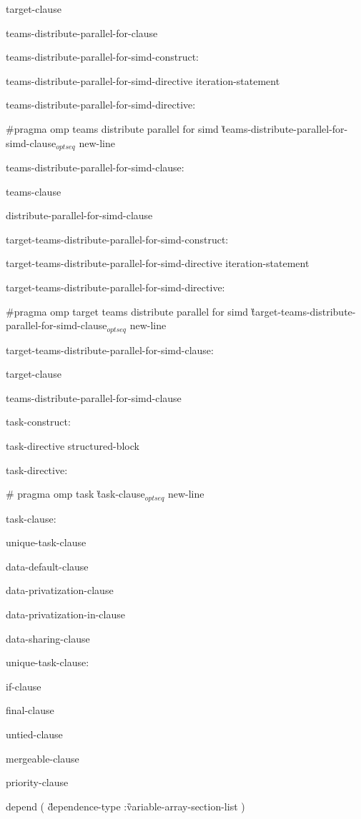{\I\I target-clause

\I\I teams-distribute-parallel-for-clause

\I teams-distribute-parallel-for-simd-construct:

\I\I teams-distribute-parallel-for-simd-directive iteration-statement

\I teams-distribute-parallel-for-simd-directive:

\C\I \#pragma omp teams distribute parallel for simd \G teams-distribute-parallel-for-simd-clause$_{optseq}$ new-line

\I teams-distribute-parallel-for-simd-clause:

\I\I teams-clause

\I\I distribute-parallel-for-simd-clause

\I target-teams-distribute-parallel-for-simd-construct:

\I\I target-teams-distribute-parallel-for-simd-directive iteration-statement

\I target-teams-distribute-parallel-for-simd-directive:

\C\I\I \#pragma omp target teams distribute parallel for simd \G target-teams-distribute-parallel-for-simd-clause$_{optseq}$ new-line

\I target-teams-distribute-parallel-for-simd-clause:

\I\I target-clause

\I\I teams-distribute-parallel-for-simd-clause

\I task-construct:

\I\I task-directive structured-block

\I task-directive:

\C\I\I \# pragma omp task \G task-clause$_{optseq}$ new-line

task-clause:

\I unique-task-clause

\I data-default-clause

\I data-privatization-clause

\I data-privatization-in-clause

\I data-sharing-clause

unique-task-clause:

\I if-clause

\I final-clause

\I untied-clause

\I mergeable-clause 

\I priority-clause

\C\I depend ( \G dependence-type \C :\G variable-array-section-list \C )

}

